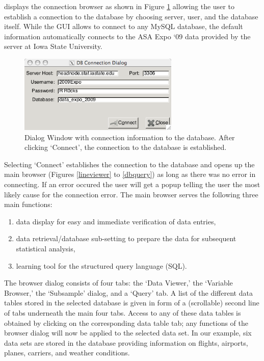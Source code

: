 \documentclass[11pt]{tise_style}
\begin{document}
displays the connection browser as shown in Figure  \ref{dbconnect} allowing the user to establish a connection to the database by choosing server, user, and the database itself. While the GUI allows to connect to any MySQL database, the default information automatically connects to the ASA Expo `09 data provided by the server at Iowa State University. \\[.25cm]



\begin{figure}[htbp] %
   \centering
   \includegraphics[width=3in]{dbconnect-dialog.png} 
   \caption{Dialog Window with connection information to the database. After clicking `Connect', the connection to the database is established.}
   \label{dbconnect}
\end{figure}



Selecting `Connect' establishes the connection to the database and opens up the main browser (Figures \ref{lineviewer} to \ref{dbquery}) as long as there was no error in connecting.  If an error occured the user will get a popup telling the user the most likely cause for the connection error.  The main browser serves the following three main functions:
\begin{enumerate}
\item data display for easy and immediate verification of data entries, 
\item data retrieval/database sub-setting to prepare the data for subsequent statistical analysis, 
\item learning tool for the structured query language (SQL).
\end{enumerate}

The browser dialog consists of four tabs: the `Data Viewer,' the `Variable Browser,' the `Subsample' dialog, and a `Query' tab.  A list of the different data tables stored in the selected database is given in form of a (scrollable) second line of tabs underneath the main four tabs. Access to any of these data tables is obtained  by clicking on the corresponding data table tab; any functions of the browser dialog will now be applied to the selected data set. In our example, six data sets are stored in the database  providing information on flights, airports, planes, carriers, and weather conditions. 
\end{document}
